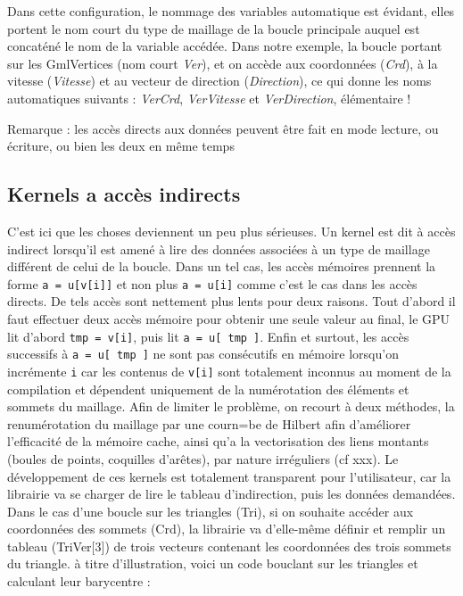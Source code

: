 \documentclass[a4paper,12pt]{article}
\begin{document}
Dans cette configuration, le nommage des variables automatique est évidant, elles portent le nom court du type de maillage de la boucle principale auquel est concaténé le nom de la variable accédée. Dans notre exemple, la boucle portant sur les GmlVertices (nom court \emph{Ver}), et on accède aux coordonnées (\emph{Crd}), à la vitesse (\emph{Vitesse}) et au vecteur de direction (\emph{Direction}), ce qui donne les noms automatiques suivants : \emph{VerCrd}, \emph{VerVitesse} et \emph{VerDirection}, élémentaire !

Remarque : les accès directs aux données peuvent être fait en mode lecture, ou écriture, ou bien les deux en même temps

\subsection{Kernels a accès indirects}
C'est ici que les choses deviennent un peu plus sérieuses.
Un kernel est dit à accès indirect lorsqu'il est amené à lire des données associées à un type de maillage différent de celui de la boucle. Dans un tel cas, les accès mémoires prennent la forme {\tt a = u[v[i]]} et non plus {\tt a = u[i]} comme c'est le cas dans les accès directs. De tels accès sont nettement plus lents pour deux raisons. Tout d'abord il faut effectuer deux accès mémoire pour obtenir une seule valeur au final, le GPU lit d'abord {\tt tmp = v[i]}, puis lit {\tt a = u[ tmp ]}. Enfin et surtout, les accès successifs à {\tt a = u[ tmp ]} ne sont pas consécutifs en mémoire lorsqu'on incrémente {\tt i} car les contenus de {\tt v[i]} sont totalement inconnus au moment de la compilation et dépendent uniquement de la numérotation des éléments et sommets du maillage. Afin de limiter le problème, on recourt à deux méthodes, la renumérotation du maillage par une courn=be de Hilbert afin d'améliorer l'efficacité de la mémoire cache, ainsi qu'a la vectorisation des liens montants (boules de points, coquilles d'arêtes), par nature irréguliers (cf xxx).
Le développement de ces kernels est totalement transparent pour l'utilisateur, car la librairie va se charger de lire le tableau d'indirection, puis les données demandées. Dans le cas d'une boucle sur les triangles (Tri), si on souhaite accéder aux coordonnées des sommets (Crd), la librairie va d'elle-même définir et remplir un tableau (TriVer[3]) de trois vecteurs contenant les coordonnées des trois sommets du triangle.
à titre d'illustration, voici un code bouclant sur les triangles et calculant leur barycentre :
\end{document}
